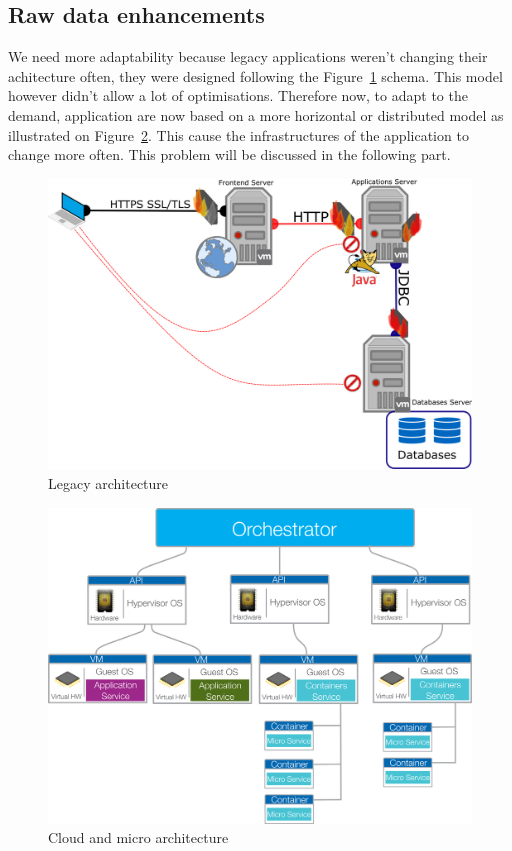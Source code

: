 \documentclass[10pt,a4paper,oneside]{article}
\begin{document}
\begin{multicols}{2}
\section{Raw data enhancements}
We need more adaptability because legacy applications weren't changing their achitecture often, they were designed following the Figure~\ref{omodl} schema. This model however didn't allow a lot of optimisations. Therefore now, to adapt to the demand, application are now based on a more horizontal or distributed model as illustrated on Figure~\ref{nmodl}. This cause the infrastructures of the application to change more often. This problem will be discussed in the following part.
\end{multicols}

\begin{figure}[!ht]
\centering
\includegraphics[scale=0.40]{./images/PNG/Application_legacy.png}
\caption{Legacy architecture}
\label{omodl}
\end{figure}

\vspace{0.5cm}

\begin{figure}[!ht]
\centering
\includegraphics[scale=0.60]{./images/PNG/micro_archi.png}
\caption{Cloud and micro architecture}
\label{nmodl}
\end{figure}
\end{document}
